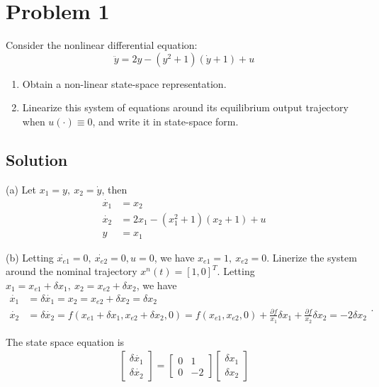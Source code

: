 \documentclass[11pt]{report}
\theoremstyle{definition}
\begin{document}
\section*{Problem 1}
Consider the nonlinear differential equation:
\[
\ddot y = 2y - (y^2 + 1)(\dot y + 1) + u
\]
\begin{enumerate}[label=\alph*)]
\item Obtain a non-linear state-space representation.
\item Linearize this system of equations around its equilibrium output trajectory when $u(\cdot) \equiv 0$, and write it in state-space form.
\end{enumerate}
\subsection*{Solution}

(a) Let $x_1=y,~x_2=\dot{y}$, then
\begin{equation*}
\begin{split}
  \dot{x_1} &= x_2\\
  \dot{x_2} &= 2x_1 - (x_1^2+1)(x_2+1) + u\\
  y &= x_1
\end{split}
\end{equation*}

\noindent(b) Letting $\dot{x_{e1}} = 0,~\dot{x_{e2}} = 0, u = 0$, we have $x_{e1} = 1,~x_{e2} = 0$. Linerize the system around the nominal trajectory $x^n(t) = [1, 0]^T$. Letting $x_1 = x_{e1} + \delta x_1,~x_2 = x_{e2} + \delta x_2$, we have
\begin{equation*}
\begin{split}
  \dot{x_1} &= \delta\dot{x_1} = x_2 = x_{e2} + \delta x_2 = \delta x_2\\
  \dot{x_2} &= \delta\dot{x_2} = f(x_{e1}+\delta x_1, x_{e2}+\delta x_2, 0) =  f(x_{e1}, x_{e2}, 0) + \frac{\partial f}{x_1} \delta x_1 + \frac{\partial f}{x_2} \delta x_2 = -2\delta x_2
\end{split}
.
\end{equation*}

The state space equation is
\begin{equation*}
\begin{split}
\begin{bmatrix}\delta \dot{x_1} \\ \delta \dot{x_2} \end{bmatrix} = \begin{bmatrix} 0&1\\0&-2 \end{bmatrix} \begin{bmatrix} \delta x_1 \\ \delta x_2 \end{bmatrix}
\end{split}
\end{equation*}
\end{document}
